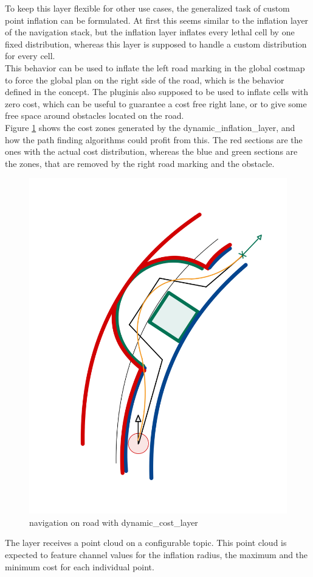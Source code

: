 To keep this layer flexible for other use cases, the generalized task of custom point inflation can be formulated. At first this seems similar to the inflation layer of the navigation stack, but the inflation layer inflates every lethal cell by one fixed distribution, whereas this layer is supposed to handle a custom distribution for every cell.\\

This behavior can be used to inflate the left road marking in the global costmap to force the global plan on the right side of the road, which is the behavior defined in the concept. The pluginis also supposed to be used to inflate cells with zero cost, which can be useful to guarantee a cost free right lane, or to give some free space around obstacles located on the road.\\


Figure \ref{dynnav} shows the cost zones generated by the dynamic\_inflation\_layer, and how the path finding algorithms could profit from this. The red sections are the ones with the actual cost distribution, whereas the blue and green sections are the zones, that are removed by the right road marking and the obstacle.\\

\begin{figure}
	\centering
	\includegraphics[width=.5\textwidth]{Pictures/inflationlayernav}
	\caption{navigation on road with dynamic\_cost\_layer}
	\label{dynnav}
\end{figure}


The layer receives a point cloud on a configurable topic. This point cloud is expected to feature channel values for the inflation radius, the maximum and the minimum cost for each individual point.\\

